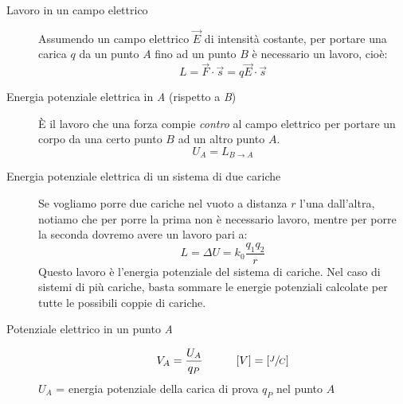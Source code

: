 \documentclass[a4paper,11pt,italian]{article}
\begin{document}
\begin{description}
  
  \item[Lavoro in un campo elettrico] 
  Assumendo un campo elettrico $ \vec{E} $ di intensità costante, per portare una carica $ q $ da un punto $ A $ fino ad un punto $ B $ è necessario un lavoro, cioè:
  \[ L = \vec{F} \cdot \vec{s} = q \vec{E} \cdot \vec{s}  \]
  
  \item[Energia potenziale elettrica in \textit{A} (rispetto a \textit{B})] 
  È il lavoro che una forza compie \emph{contro} al campo elettrico per portare un corpo da una certo punto $ B $ ad un altro punto $ A $.
  \[ U_A = L_{B\rightarrow A} \]
  
  \item[Energia potenziale elettrica di un sistema di due cariche] 
  Se vogliamo porre due cariche nel vuoto a distanza $ r $ l'una dall'altra, notiamo che per porre la prima non è necessario lavoro, mentre per porre la seconda dovremo avere un lavoro pari a:
  \[ L = \Delta U = k_0 \frac{q_1 q_2}{r}  \]
  Questo lavoro è l'energia potenziale del sistema di cariche. Nel caso di sistemi di più cariche, basta sommare le energie potenziali calcolate per tutte le possibili coppie di cariche.
  
  \item[Potenziale elettrico in un punto \textit{A}]
  \[ V_A = \frac{U_A}{q_P} \hspace*{3em} [V] =  \left[ \sfrac{J}{C} \right] \]
  $ U_A $ = energia potenziale della carica di prova $ q_P $ nel punto $ A $
  

\end{description}
\end{document}

